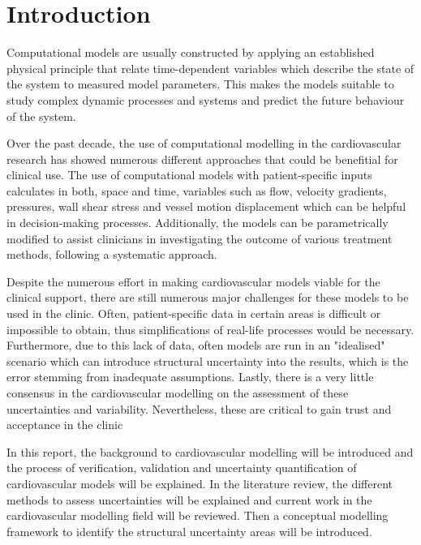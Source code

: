 \chapter{Introduction}
\label{chapterlabel1}

Computational models are usually constructed by applying an established physical principle that relate time-dependent variables which describe the state of the system to measured model parameters. This makes the models suitable to study complex dynamic processes and systems and predict the future behaviour of the system.\par

Over the past decade, the use of computational modelling in the cardiovascular research has showed numerous different approaches that could be benefitial for clinical use. The use of computational models with patient-specific inputs calculates in both, space and time, variables such as flow, velocity gradients, pressures, wall shear stress and vessel motion displacement which can be helpful in decision-making processes. Additionally, the models can be parametrically modified to assist clinicians in investigating the outcome of various treatment methods, following a systematic approach.

Despite the numerous effort in making cardiovascular models viable for the clinical support, there are still numerous major challenges for these models to be used in the clinic. Often, patient-specific data in certain areas is difficult or impossible to obtain, thus simplifications of real-life processes would be necessary. Furthermore, due to this lack of data, often models are run in an "idealised" scenario which can introduce structural uncertainty into the results, which is the error stemming from inadequate assumptions. Lastly, there is a very little consensus in the cardiovascular modelling on the assessment of these uncertainties and variability. Nevertheless, these are critical to gain trust and acceptance in the clinic  \par

In this report, the background to cardiovascular modelling will be introduced and the process of verification, validation and uncertainty quantification of cardiovascular models will be explained. In the literature review, the different methods to assess uncertainties will be explained and current work in the cardiovascular modelling field  will be reviewed. Then a conceptual modelling framework to identify the structural uncertainty areas will be introduced.